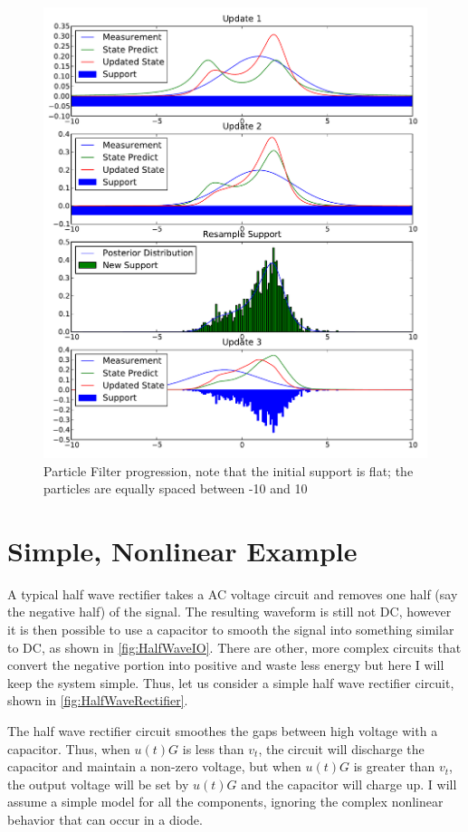 \begin{figure}
\includegraphics[width=16cm]{images/particle_filter}
\caption{Particle Filter progression, note that the initial support is flat; the particles
are equally spaced between -10 and 10}
\end{figure}

\section{Simple, Nonlinear Example}
A typical half wave rectifier takes a AC voltage circuit and removes
one half (say the negative half) of the signal. The resulting waveform
is still not DC, however it is then possible to use a capacitor to 
smooth the signal into something similar to DC, as shown in \autoref{fig:HalfWaveIO}.
There are other, more
complex circuits that convert the negative portion into positive and
waste less energy but here I will keep the system simple.
Thus, let us consider a simple half wave rectifier circuit, shown in 
\autoref{fig:HalfWaveRectifier}.

The half wave rectifier circuit smoothes the gaps between high voltage
with a capacitor. Thus, when $u(t)G$ is less than $v_t$, the circuit will 
discharge the capacitor and maintain a non-zero voltage,
but when $u(t)G$ is greater than $v_t$, the output voltage will be set
by $u(t)G$ and the capacitor will charge up. I will assume a simple
model for all the components, ignoring the complex nonlinear behavior
that can occur in a diode. 


